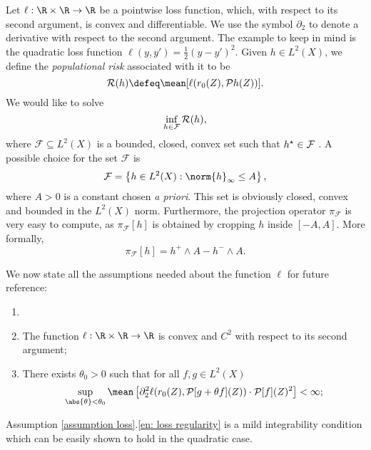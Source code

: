 Let $ \ell : \R \times \R \to \R $ be a pointwise loss function, which, with respect to its second argument, is convex and differentiable.
We use the symbol $ \partial_{ 2 } $ to denote a derivative with respect to the second argument.
The example to keep in mind is the quadratic loss function $ \ell ( y, y' ) = \frac{ 1 }{ 2 } ( y - y' )^2 $.
Given $ h \in L^{ 2 } ( X ) $, we define the \emph{populational risk} associated with it to be
\begin{equation*}
    \risk ( h ) \defeq \mean [ \ell ( r_{ 0 } ( Z ), \meanop h ( Z ) ) ]
.\end{equation*}
We would like to solve
\begin{equation*}
    \inf_{ h \in \mathcal{F} } \mathcal{R} ( h )
,\end{equation*}
where $ \mathcal{F} \subseteq L^{ 2 } ( X ) $ is a bounded, closed, convex set such that $ h^{ \star } \in \mathcal{F} $ .
A possible choice for the set $ \mathcal{F} $ is
\begin{equation*}
    \mathcal{F} = \left\{ h \in L^{ 2 } ( X ) : \norm{ h }_{ \infty } \leq A \right\}
,\end{equation*}
where $ A > 0 $ is a constant chosen \emph{a priori}.
This set is obviously closed, convex and bounded in the $ L^2 ( X ) $ norm.
Furthermore, the projection operator $ \pi_{ \mathcal{F} } $ is very easy to compute, as $ \pi_{ \mathcal{F} } [ h ] $ is obtained by cropping $ h $ inside $ [ -A, A ] $.
More formally,
\begin{equation*}
    \pi_{ \mathcal{F} } [ h ] = h^{ + } \wedge A - h^{ - } \wedge A
.\end{equation*}

We now state all the assumptions needed about the function $ \ell $ for future reference:
\begin{assumption}
    \label{assumption loss}
    \begin{enumerate}
        \item[]
        \item The function $ \ell : \R \times \R \to \R $ is convex and $ C^2 $ with respect to its second argument;
        \item There exists $ \theta_{ 0 } > 0 $ such that for all $ f, g \in L^2 ( X ) $
            \begin{equation}
                \label{eq: loss regularity}
                \sup_{ \abs{ \theta } < \theta_{ 0 } }
                \mean \left[
                    \partial_{ 2 }^2 \ell ( r_{ 0 } ( Z ), \meanop [ g + \theta f ] ( Z ) ) \cdot \meanop [ f ] ( Z )^2
                \right] < \infty
            ;\end{equation}
            \label{en: loss regularity}
    \end{enumerate}
\end{assumption}
Assumption \ref{assumption loss}.\ref{en: loss regularity} is a mild integrability condition which can be easily shown to hold in the quadratic case.
